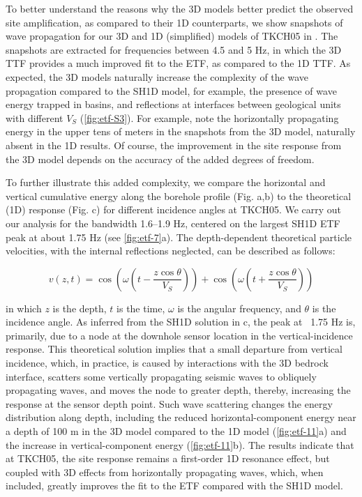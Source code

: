 {To better understand the reasons why the 3D models better predict the observed site amplification, as compared to their 1D counterparts, we show snapshots of wave propagation for our 3D and 1D (simplified) models of TKCH05 in . The snapshots are extracted for frequencies between 4.5 and 5 Hz, in which the 3D TTF provides a much improved fit to the ETF, as compared to the 1D TTF. As expected, the 3D models naturally increase the complexity of the wave propagation compared to the SH1D model, for example, the presence of wave energy trapped in basins, and reflections at interfaces between geological units with different $V_S$ (\cref{fig:etf-S3}). For example, note the horizontally propagating energy in the upper tens of meters in the snapshots from the 3D model, naturally absent in the 1D results. Of course, the improvement in the site response from the 3D model depends on the accuracy of the added degrees of freedom.

To further illustrate this added complexity, we compare the horizontal and vertical cumulative energy along the borehole profile (Fig. a,b) to the theoretical (1D) response (Fig. c) for different incidence angles at TKCH05. We carry out our analysis for the bandwidth 1.6–1.9 Hz, centered on the largest SH1D ETF peak at about 1.75 Hz (see  \cref{fig:etf-7}a). The depth-dependent theoretical particle velocities, with the internal reflections neglected, can be described as follows:

\begin{equation}\label{eq:etf-6}
  v(z, t)=\cos \left(\omega\left(t-\frac{z \cos \theta}{V_{S}}\right)\right)+\cos \left(\omega\left(t+\frac{z \cos \theta}{V_{S}}\right)\right)
\end{equation}

\noindent in which $z$ is the depth, $t$ is the time, $\omega$ is the angular frequency, and $\theta$ is the incidence angle. As inferred from the SH1D solution in c, the peak at ~1.75 Hz is, primarily, due to a node at the downhole sensor location in the vertical-incidence response. This theoretical solution implies that a small departure from vertical incidence, which, in practice, is caused by interactions with the 3D bedrock interface, scatters some vertically propagating seismic waves to obliquely propagating waves, and moves the node to greater depth, thereby, increasing the response at the sensor depth point. Such wave scattering changes the energy distribution along depth, including the reduced horizontal-component energy near a depth of 100 m in the 3D model compared to the 1D model (\cref{fig:etf-11}a) and the increase in vertical-component energy (\cref{fig:etf-11}b). The results indicate that at TKCH05, the site response remains a first-order 1D resonance effect, but coupled with 3D effects from horizontally propagating waves, which, when included, greatly improves the fit to the ETF compared with the SH1D model.

}
